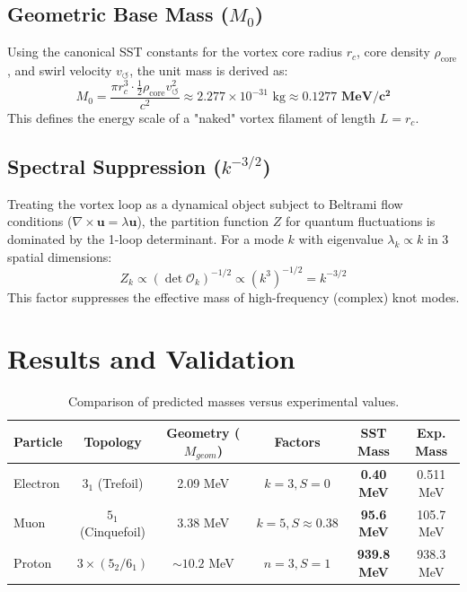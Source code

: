 \documentclass[11pt, a4paper]{article}
\begin{document}
\subsection{Geometric Base Mass ($M_0$)}
Using the canonical SST constants for the vortex core radius $r_c$, core density $\rho_{\text{core}}$, and swirl velocity $v_{\circlearrowleft}$, the unit mass is derived as:
\begin{equation}
    M_0 = \frac{\pi r_c^3 \cdot \frac{1}{2}\rho_{\text{core}} v_{\circlearrowleft}^2}{c^2} \approx 2.277 \times 10^{-31} \text{ kg} \approx \mathbf{0.1277 \text{ MeV}/c^2}
\end{equation}
This defines the energy scale of a "naked" vortex filament of length $L=r_c$.

\subsection{Spectral Suppression ($k^{-3/2}$)}
Treating the vortex loop as a dynamical object subject to Beltrami flow conditions ($\nabla \times \mathbf{u} = \lambda \mathbf{u}$), the partition function $Z$ for quantum fluctuations is dominated by the 1-loop determinant. For a mode $k$ with eigenvalue $\lambda_k \propto k$ in 3 spatial dimensions:
\begin{equation}
    Z_k \propto (\det \mathcal{O}_k)^{-1/2} \propto (k^3)^{-1/2} = k^{-3/2}
\end{equation}
This factor suppresses the effective mass of high-frequency (complex) knot modes.

\section{Results and Validation}



\begin{table}[h]
\centering
\begin{tabular}{lccccc}
\toprule
\textbf{Particle} & \textbf{Topology} & \textbf{Geometry} ($M_{geom}$) & \textbf{Factors} & \textbf{SST Mass} & \textbf{Exp. Mass} \\
\midrule
Electron & $3_1$ (Trefoil) & 2.09 MeV & $k=3, S=0$ & \textbf{0.40 MeV} & 0.511 MeV \\
Muon & $5_1$ (Cinquefoil) & 3.38 MeV & $k=5, S \approx 0.38$ & \textbf{95.6 MeV} & 105.7 MeV \\
Proton & $3 \times (5_2/6_1)$ & $\sim 10.2$ MeV & $n=3, S=1$ & \textbf{939.8 MeV} & 938.3 MeV \\
\bottomrule
\end{tabular}
\caption{Comparison of predicted masses versus experimental values.}
\label{tab:results}
\end{table}
\end{document}
